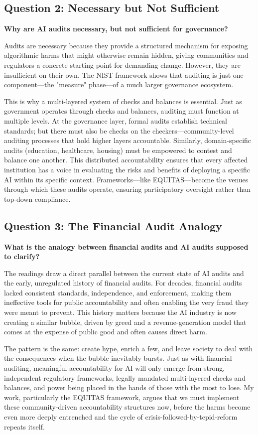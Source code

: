 \documentclass[12pt,letterpaper]{article}
\begin{document}
\subsection*{Question 2: Necessary but Not Sufficient}
\textbf{Why are AI audits necessary, but not sufficient for governance?}

Audits are necessary because they provide a structured mechanism for exposing algorithmic harms that might otherwise remain hidden, giving communities and regulators a concrete starting point for demanding change. However, they are insufficient on their own. The NIST framework shows that auditing is just one component—the "measure" phase—of a much larger governance ecosystem.

This is why a multi-layered system of checks and balances is essential. Just as government operates through checks and balances, auditing must function at multiple levels. At the governance layer, formal audits establish technical standards; but there must also be checks on the checkers—community-level auditing processes that hold higher layers accountable. Similarly, domain-specific audits (education, healthcare, housing) must be empowered to contest and balance one another. This distributed accountability ensures that every affected institution has a voice in evaluating the risks and benefits of deploying a specific AI within its specific context. Frameworks—like EQUITAS—become the venues through which these audits operate, ensuring participatory oversight rather than top-down compliance.

\subsection*{Question 3: The Financial Audit Analogy}
\textbf{What is the analogy between financial audits and AI audits supposed to clarify?}

The readings draw a direct parallel between the current state of AI audits and the early, unregulated history of financial audits. For decades, financial audits lacked consistent standards, independence, and enforcement, making them ineffective tools for public accountability and often enabling the very fraud they were meant to prevent. This history matters because the AI industry is now creating a similar bubble, driven by greed and a revenue-generation model that comes at the expense of public good and often causes direct harm.

The pattern is the same: create hype, enrich a few, and leave society to deal with the consequences when the bubble inevitably bursts. Just as with financial auditing, meaningful accountability for AI will only emerge from strong, independent regulatory frameworks, legally mandated multi-layered checks and balances, and power being placed in the hands of those with the most to lose. My work, particularly the EQUITAS framework, argues that we must implement these community-driven accountability structures now, before the harms become even more deeply entrenched and the cycle of crisis-followed-by-tepid-reform repeats itself.
\end{document}
